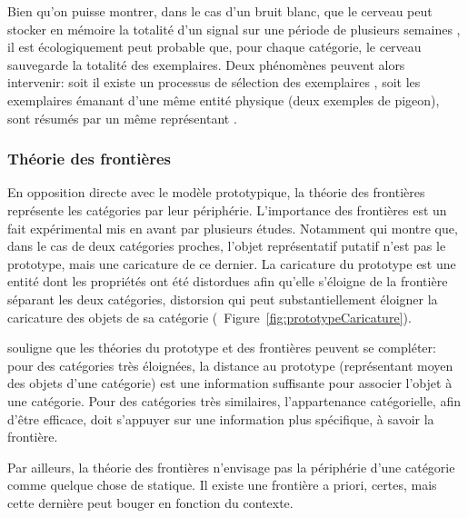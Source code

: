 Bien qu'on puisse montrer, dans le cas d'un bruit blanc, que le cerveau peut stocker en mémoire la totalité d'un signal sur une période de plusieurs semaines  \citep{agus2010rapid}, il est écologiquement peut probable que, pour chaque catégorie, le cerveau sauvegarde la totalité des exemplaires. Deux phénomènes peuvent alors intervenir: soit il existe un processus de sélection des exemplaires \citep{palmeri1995recognition}, soit les exemplaires émanant d'une même entité physique (deux exemples de pigeon), sont résumés par un même représentant \citep{barsalou1998basing} .

\subsubsection{Théorie des frontières}

En opposition directe avec le modèle prototypique, la théorie des frontières représente les catégories par leur périphérie. L'importance des frontières est un fait expérimental mis en avant par plusieurs études. Notamment \citep{davis2010memory} qui montre que, dans le cas de deux catégories proches, l'objet représentatif putatif n'est pas le prototype, mais une caricature de ce dernier. La caricature du prototype est une entité dont les propriétés ont été distordues afin qu'elle s'éloigne de la frontière séparant les deux catégories, distorsion qui peut substantiellement éloigner la caricature des objets de sa catégorie (\cf~Figure~\ref{fig:prototypeCaricature}).

\citep{goldstone2003concepts} souligne que les théories du prototype et des frontières peuvent se compléter: pour des catégories très éloignées, la distance au prototype (représentant moyen des objets d'une catégorie) est une information suffisante pour associer l'objet à une catégorie. Pour des catégories très similaires, l’appartenance catégorielle, afin d'être efficace, doit s'appuyer sur une information plus spécifique, à savoir la frontière.

Par ailleurs, la théorie des frontières n'envisage pas la périphérie d'une catégorie comme quelque chose de statique. Il existe une frontière a priori, certes, mais cette dernière peut bouger en fonction du contexte.

